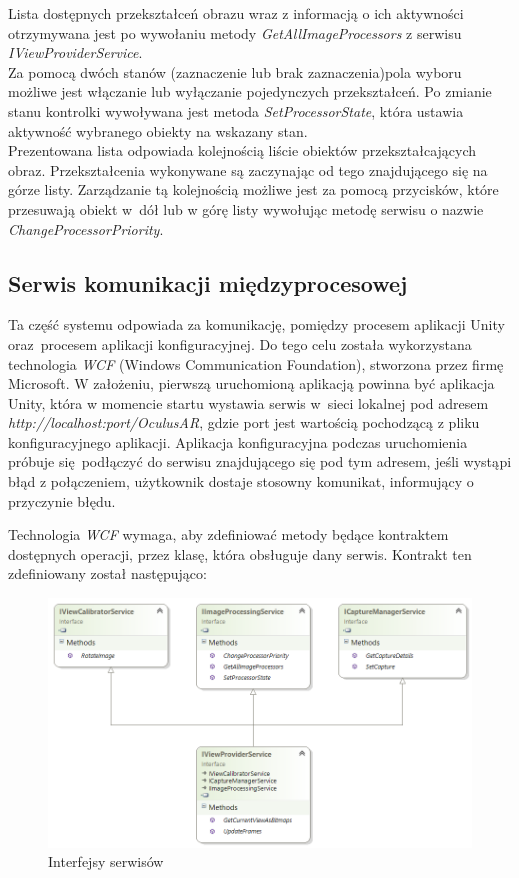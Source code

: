 \documentclass[a4paper,11pt,twoside]{report}
\theoremstyle{definition}
\begin{document}
\begin{description}
Lista dostępnych przekształceń obrazu wraz z informacją o ich aktywności otrzymywana jest po wywołaniu metody \textit{GetAllImageProcessors} z serwisu \textit{IViewProviderService}. \\
Za pomocą dwóch stanów (zaznaczenie lub brak zaznaczenia)pola wyboru możliwe jest włączanie lub wyłączanie pojedynczych przekształceń. Po zmianie stanu kontrolki wywoływana jest metoda \textit{SetProcessorState}, która ustawia aktywność wybranego obiekty na wskazany stan. \\
Prezentowana lista odpowiada kolejnością liście obiektów przekształcających obraz.  Przekształcenia wykonywane są zaczynając od tego znajdującego się na górze listy. Zarządzanie tą kolejnością możliwe jest za pomocą przycisków, które przesuwają obiekt w~dół lub w górę listy wywołując metodę serwisu o nazwie \textit{ChangeProcessorPriority}.

\end{description}

\subsection{Serwis komunikacji międzyprocesowej}

Ta część systemu odpowiada za komunikację, pomiędzy procesem aplikacji Unity oraz~procesem aplikacji konfiguracyjnej. Do tego celu została wykorzystana technologia \textit{WCF}  (Windows Communication Foundation), stworzona przez firmę Microsoft. W założeniu, pierwszą uruchomioną aplikacją powinna być aplikacja Unity, która w momencie startu wystawia serwis w~sieci lokalnej pod adresem \textit{http://localhost:{port}/OculusAR}, gdzie port jest wartością pochodzącą z pliku konfiguracyjnego aplikacji. Aplikacja konfiguracyjna podczas uruchomienia próbuje się~podłączyć do serwisu znajdującego się pod tym adresem, jeśli wystąpi błąd z połączeniem, użytkownik dostaje stosowny komunikat, informujący o przyczynie błędu. 

\pagebreak
Technologia \textit{WCF} wymaga, aby zdefiniować metody będące kontraktem dostępnych operacji, przez klasę, która obsługuje dany serwis. Kontrakt ten zdefiniowany został następująco:
\begin{figure}[H]
\centering
\includegraphics[scale=0.9]{images/IViewProviderService}
\caption[Serwisy diagram]{Interfejsy serwisów}
\end{figure}
\end{document}
